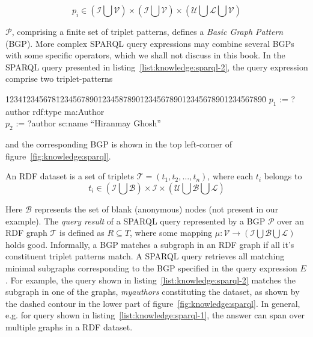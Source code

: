 \begin{equation}
	p_i \in \left( \mathcal{I} \bigcup \mathcal{V} \right) \times \left( \mathcal{I} \bigcup \mathcal{V} \right)
		\times \left( \mathcal{U} \bigcup \mathcal{L} \bigcup \mathcal{V} \right)
\end{equation}

\noindent
{} 
$\mathcal{P}$, comprising a finite set of triplet patterns, defines a {\em Basic Graph Pattern} (BGP). More complex SPARQL query 
expressions may combine several BGPs with some specific operators, which we shall not discuss in this book.
%
In the SPARQL query presented in listing~\ref{list:knowledge:sparql-2}, the query expression comprise two triplet-patterns 
\begin{tabbing}
	1234\=12345678\=1234567890\=1234587890\=123456789012345678901234567890\=\kill
        \> $p_1$ := \> ?author \> rdf:type \> ma:Author \\
	\> $p_2$ := \> ?author \> sc:name  \> ``Hiranmay Ghosh'' \\
\end{tabbing}

\noindent
and the corresponding BGP is shown in the top left-corner of figure~\ref{fig:knowledge:sparql}.

\noindent
An RDF dataset is a set of triplets $\mathcal{T} = (t_1, t_2, \dots, t_n)$, where each $t_i$ belongs to
\begin{equation}
	t_i \in \left( \mathcal{I} \bigcup \mathcal{B} \right) \times \mathcal{I} 
		\times \left( \mathcal{U} \bigcup \mathcal{B} \bigcup \mathcal{L} \right)
\end{equation}

\noindent
Here $\mathcal{B}$ represents the set of blank (anonymous) nodes (not present in our example). 
%
The {\em query result} of a SPARQL query represented by a BGP $\mathcal{P}$ over an RDF graph $\mathcal{T}$ 
is defined as $R \subseteq T$, where some mapping $\mu: \mathcal{V} \rightarrow \left( \mathcal{I} \bigcup \mathcal{B} \bigcup 
\mathcal{L} \right)$ holds good.
%
 
Informally, a BGP matches a subgraph in an RDF graph if all it's constituent triplet patterns match. A SPARQL query 
retrieves all matching minimal subgraphs corresponding to the BGP specified in the query expression $E$. For example, the query
shown in listing~\ref{list:knowledge:sparql-2} matches the subgraph in one of the graphs, {\it myauthors} constituting the dataset,
as shown by the dashed contour in the lower part of figure~\ref{fig:knowledge:sparql}. In general, e.g.  for query shown in 
listing~\ref{list:knowledge:sparql-1}, the answer can span over multiple graphs in a RDF dataset.

